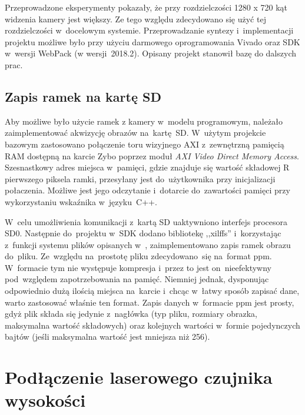Przeprowadzone eksperymenty pokazały, że przy rozdzielczości 1280 x 720 kąt widzenia kamery jest większy. 
Ze tego względu zdecydowano się użyć tej rozdzielczości w~docelowym systemie.
Przeprowadzanie syntezy i~implementacji projektu możliwe było przy użyciu darmowego oprogramowania Vivado oraz SDK w~wersji WebPack (w wersji~2018.2). 
Opisany projekt stanowił bazę do dalszych prac.

\subsection{Zapis ramek na kartę SD}
\label{sec:image_sd}
Aby możliwe było użycie ramek z kamery w~modelu programowym, należało zaimplementować akwizycję obrazów na~kartę~SD. 
W~użytym projekcie bazowym zastosowano połączenie toru wizyjnego AXI z~zewnętrzną pamięcią RAM dostępną na karcie Zybo poprzez moduł \textit{AXI Video Direct Memory Access}. 
Szesnastkowy adres miejsca w~pamięci, gdzie znajduje się wartość składowej R pierwszego piksela ramki, przesyłany jest do~użytkownika przy inicjalizacji połaczenia. Możliwe jest jego odczytanie i~dotarcie do~zawartości pamięci przy wykorzystaniu wskaźnika w~języku~C++.

W~celu umożliwienia komunikacji z~kartą SD uaktywniono interfejs procesora SD0. 
Następnie do~projektu w~SDK dodano bibliotekę ,,xilffs'' i~korzystając z~funkcji systemu plików opisanych w~\cite{xilffs}, zaimplementowano zapis ramek obrazu do~pliku. 
Ze~względu na~prostotę pliku zdecydowano~się na~format ppm. 
W~formacie tym nie występuje kompresja i~przez to jest on~nieefektywny pod~względem zapotrzebowania na pamięć.
Niemniej jednak, dysponując odpowiednio dużą ilością miejsca na~karcie i~chcąc w~łatwy sposób zapisać dane, warto zastosować właśnie ten format. 
Zapis danych w~formacie ppm jest prosty, gdyż plik składa się jedynie z~nagłówka (typ pliku, rozmiary obrazka, maksymalna wartość składowych) oraz kolejnych wartości w~formie pojedynczych bajtów (jeśli maksymalna wartość jest mniejsza niż 256).  



\section{Podłączenie laserowego czujnika wysokości}
\label{subsec:podlaczenie_lasera}

